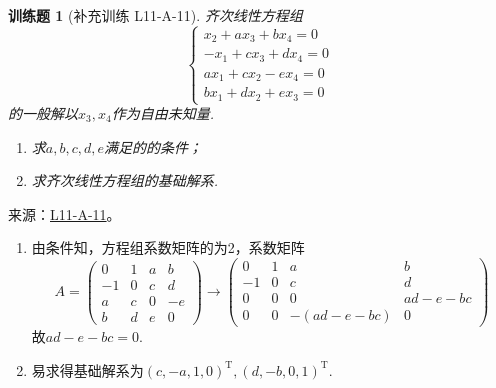 \documentclass[12pt,fontset=fandol]{ctexart}
\newtheorem{exercise}{训练题}[section]
\begin{document}
\begin{exercise}[补充训练 L11-A-11]\label{prob:L11-A-11}
齐次线性方程组\[\begin{cases}
                x_2+ax_3+bx_4=0  \\
                -x_1+cx_3+dx_4=0 \\
                ax_1+cx_2-ex_4=0 \\
                bx_1+dx_2+ex_3=0
            \end{cases}\]的一般解以$x_3,x_4$作为自由未知量.
        \begin{enumerate}
            \item 求$a,b,c,d,e$满足的的条件；

            \item 求齐次线性方程组的基础解系.
        \end{enumerate}
\end{exercise}
\noindent 来源：\href{https://github.com/yhwu-is/Linear-Algebra-Left-Undone/blob/new/%E8%AE%B2%E4%B9%89/%E4%B8%93%E9%A2%98/11%20%E6%9C%9D%E8%8A%B1%E5%A4%95%E6%8B%BE.tex}{L11-A-11}。
\begin{solve}
\begin{enumerate}
                \item 由条件知，方程组系数矩阵的为2，系数矩阵
                      \[ A=\begin{pmatrix}
                              0  & 1 & a & b  \\
                              -1 & 0 & c & d  \\
                              a  & c & 0 & -e \\
                              b  & d & e & 0
                          \end{pmatrix}\rightarrow
                          \begin{pmatrix}
                              0  & 1 & a          & b       \\
                              -1 & 0 & c          & d       \\
                              0  & 0 & 0          & ad-e-bc \\
                              0  & 0 & -(ad-e-bc) & 0
                          \end{pmatrix} \]
                      故$ad-e-bc=0$.

                \item 易求得基础解系为$(c,-a,1,0)^\mathrm{T},(d,-b,0,1)^\mathrm{T}$.
            \end{enumerate}
\end{solve}
\end{document}
